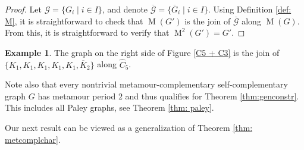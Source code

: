 \documentclass[12pt]{amsart}
\theoremstyle{definition}
\newtheorem{example}[theorem]{Example}
\theoremstyle{remark}
\numberwithin{equation}{section}
\numberwithin{figure}{section}
\renewcommand{\mod}{\operatorname{mod}}
\newcommand{\M}{\operatorname{M}}
\newcommand{\diam}{\operatorname{diam}}
\begin{document}
\begin{proof}
    Let $\mathcal{G}= \{ G_i \mid i\in I \}$, and denote $\overline{\mathcal{G}}= \{ \overline{G}_i \mid i\in I \}$. Using Definition \ref{def: M}, it is straightforward to check that $\M(G')$ 
    is the join of $\overline{\mathcal{G}}$ along $\M(G)$.    
    From this, it is straightforward to verify that \mbox{$\M^2(G')=G'$}.
\end{proof}

\begin{example}
   The graph on the right side of Figure \ref{C5 + C3} is the join of $\{K_1,K_1,K_1,K_1,K_1,\overline{K}_2\}$ along $\widehat{C}_5$.

   Note also that every nontrivial metamour-complementary self-com\-ple\-mentary graph $G$ has metamour period $2$ and thus qualifies for Theorem \ref{thm:genconstr}. This includes all Paley graphs, see Theorem \ref{thm: paley}. %
\end{example}
    

Our next result can be viewed as a generalization of Theorem \ref{thm: metcomplchar}.
\end{document}
